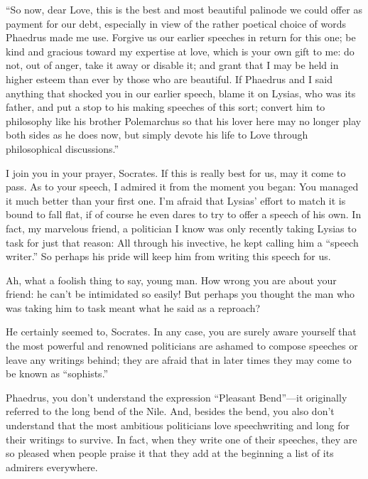“So now, dear Love, this is the best and most beautiful
palinode we could
offer as payment for our debt, especially in view of the rather poetical
choice of words Phaedrus made me
use. Forgive us our
earlier speeches in return for this one; be kind and gracious toward my
expertise at love, which is your own gift to me: do not, out of anger,
take it away or disable it; and grant that I may be held in higher
esteem than ever by those who are beautiful. If Phaedrus and I
said anything that shocked you in our earlier speech, blame it on
Lysias, who was its father, and put a stop to his making speeches of
this sort; convert him to philosophy like his brother Polemarchus so
that his lover here may no longer play both sides as he does now, but
simply devote his life to Love through philosophical discussions.”

\sayphaedrus I join you in your prayer, Socrates. If this is really
best for us, may it come to pass. As to your speech, I admired it from
the moment you began: You managed it much better than your first one.
I'm afraid that Lysias' effort to match it is bound to fall flat, if of
course he even dares to try to offer a speech of his own. In fact, my
marvelous friend, a politician I know was only recently taking Lysias to
task for just that reason: All through his invective, he kept calling
him a “speech writer.” So perhaps his pride will keep him from writing
this speech for us.

\saysocrates Ah, what a foolish thing to say, young man. How wrong
you are about your friend: he can't be intimidated so easily! But
perhaps you thought the man who was taking him to task meant what he
said as a reproach?

\sayphaedrus He certainly seemed to, Socrates. In any case, you are surely
aware yourself that the most powerful and renowned politicians are
ashamed to compose speeches or leave any writings behind; they are
afraid that in later times they may come to be known as “sophists.”

\saysocrates Phaedrus, you don't understand the expression “Pleasant 
Bend”---it originally referred to the long bend of the
Nile. And, besides the
bend, you also don't understand that the most ambitious politicians love
speechwriting and long for their writings to survive. In fact, when they
write one of their speeches, they are so pleased when people praise it
that they add at the beginning a list of its admirers everywhere.

